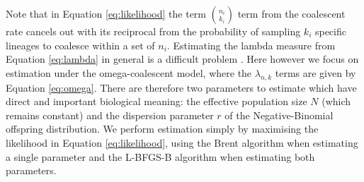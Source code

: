 \documentclass{article}
\renewcommand{\eqref}[1]{\ref{#1}}
\begin{document}
Note that in Equation \eqref{eq:likelihood} the term $\binom{n_i}{k_i}$  term from the
coalescent rate cancels out with its reciprocal from the probability of sampling $k_i$ specific
lineages to coalesce within a set of $n_i$.
Estimating the lambda measure from Equation \eqref{eq:lambda} 
in general is a difficult problem
\citep{Koskela2018a,miropinaEstimatingLambdaMeasure2023}.
Here however we focus on estimation under the omega-coalescent model,
where the $\lambda_{n,k}$ terms are given by Equation \eqref{eq:omega}.
There are therefore two parameters to estimate which have direct and important 
biological meaning:
the effective population size $N$ (which remains constant) and the dispersion
parameter $r$ of the Negative-Binomial offspring distribution. 
We perform estimation simply by maximising the likelihood in Equation \eqref{eq:likelihood},
using the Brent algorithm \citep{brent1971algorithm} when estimating a single parameter
and the L-BFGS-B algorithm \citep{byrd1995limited} when estimating both parameters.
\end{document}
